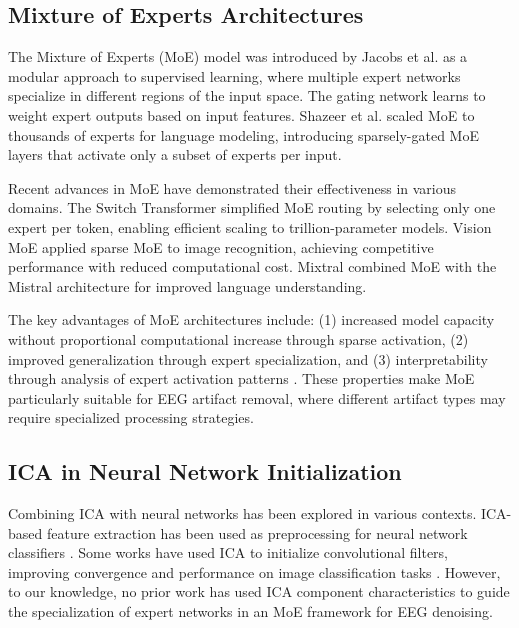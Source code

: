 \documentclass[journal]{IEEEtran}
\begin{document}
\subsection{Mixture of Experts Architectures}

The Mixture of Experts (MoE) model was introduced by Jacobs et al. \cite{jacobs1991adaptive} as a modular approach to supervised learning, where multiple expert networks specialize in different regions of the input space. The gating network learns to weight expert outputs based on input features. Shazeer et al. \cite{shazeer2017outrageously} scaled MoE to thousands of experts for language modeling, introducing sparsely-gated MoE layers that activate only a subset of experts per input.

Recent advances in MoE have demonstrated their effectiveness in various domains. The Switch Transformer \cite{fedus2022switch} simplified MoE routing by selecting only one expert per token, enabling efficient scaling to trillion-parameter models. Vision MoE \cite{riquelme2021scaling} applied sparse MoE to image recognition, achieving competitive performance with reduced computational cost. Mixtral \cite{jiang2024mixtral} combined MoE with the Mistral architecture for improved language understanding.

The key advantages of MoE architectures include: (1) increased model capacity without proportional computational increase through sparse activation, (2) improved generalization through expert specialization, and (3) interpretability through analysis of expert activation patterns \cite{chen2023mixture}. These properties make MoE particularly suitable for EEG artifact removal, where different artifact types may require specialized processing strategies.

\subsection{ICA in Neural Network Initialization}

Combining ICA with neural networks has been explored in various contexts. ICA-based feature extraction has been used as preprocessing for neural network classifiers \cite{makeig2004mining}. Some works have used ICA to initialize convolutional filters, improving convergence and performance on image classification tasks \cite{le2011ica}. However, to our knowledge, no prior work has used ICA component characteristics to guide the specialization of expert networks in an MoE framework for EEG denoising.
\end{document}
